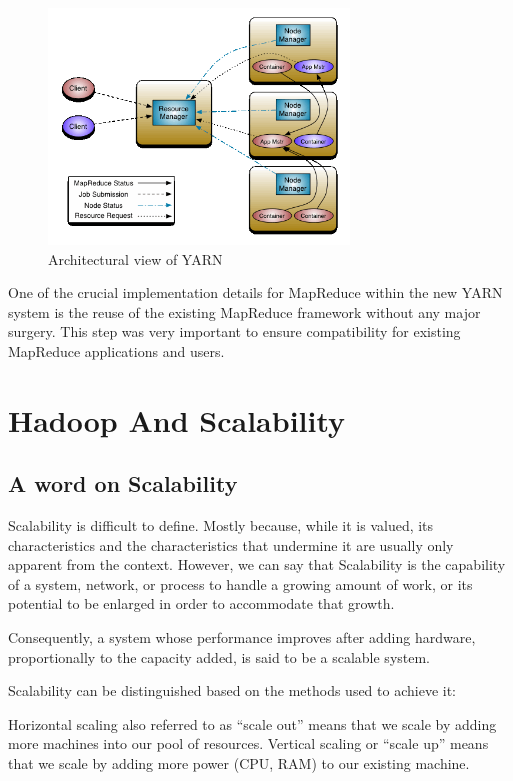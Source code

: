 \documentclass[conference]{IEEEtran}
\begin{document}
\begin{enumerate}
\begin{figure}[h!]
        \centering
        \includegraphics[width=80mm]{yarn}
        \caption{Architectural view of YARN}
\end{figure}

One of the crucial implementation details for MapReduce within the new YARN system is the
reuse of the existing MapReduce framework without any major surgery. This step was very
important to ensure compatibility for existing MapReduce applications and users. 


\end{enumerate}


\section{Hadoop And Scalability}

\subsection{A word on Scalability}

Scalability is difficult to define. \cite{Hill1990} Mostly because, while it is valued, its characteristics and
the characteristics that undermine it are usually only apparent from the context. However,
we can say that Scalability is the capability of a system, network, or process to handle a
growing amount of work, or its potential to be enlarged in order to accommodate that
growth. \cite{Bondi2000}

Consequently, a system whose performance improves after adding hardware,
proportionally to the capacity added, is said to be a scalable system.

Scalability can be distinguished based on the methods used to achieve it:

Horizontal scaling also referred to as “scale out” means that we scale by adding more
machines into our pool of resources.
Vertical scaling or “scale up” means that we scale by adding more power (CPU, RAM) to
our existing machine.
\end{document}
